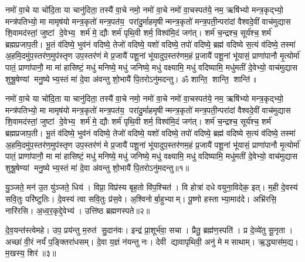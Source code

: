 \setcounter{anuvakam}{0}
नमो॑ वा॒चे या चो॑दि॒ता या चानु॑दिता॒ तस्यै॑ वा॒चे नमो॒ नमो॑ वा॒चे नमो॑ वा॒चस्पत॑ये॒ नम॒ ऋषि॑भ्यो मन्त्र॒कृद्भ्यो॒ मन्त्र॑पतिभ्यो॒ मा मामृष॑यो मन्त्र॒कृतो॑ मन्त्र॒पत॑य॒ परा॑दु॒र्माहमृषीन्मन्त्र॒कृतो॑ मन्त्र॒पती॒न्परा॑दां वैश्वदे॒वीं वाच॑मुद्यास शि॒वामद॑स्तां॒ जुष्टां दे॒वेभ्य॒ शर्म॑ मे॒ द्यौः  शर्म॑ पृथि॒वी शर्म॒ विश्व॑मि॒दं जग॑त्। 
शर्म॑ च॒न्द्रश्च॒ सूर्य॑श्च॒ शर्म॑ ब्रह्मप्रजाप॒ती। 
भू॒तं व॑दिष्ये॒ भुव॑नं वदिष्ये॒ तेजो॑ वदिष्ये॒ यशो॑ वदिष्ये॒ तपो॑ वदिष्ये॒ ब्रह्म॑ वदिष्ये स॒त्यं व॑दिष्ये॒ तस्मा॑ अ॒हमि॒दमु॑प॒स्तर॑ण॒मुप॑स्तृण उप॒स्तर॑णं मे प्र॒जायै॑ पशू॒नां भू॑यादुप॒स्तर॑णम॒हं प्र॒जायै॑ पशू॒नां भू॑यासं॒ प्राणा॑पानौ मृ॒त्योर्मा॑ पातं॒ प्राणा॑पानौ॒ मा मा॑ हासिष्टं॒ मधु॑ मनिष्ये॒ मधु॑ जनिष्ये॒ मधु॑ वक्ष्यामि॒ मधु॑ वदिष्यामि॒ मधु॑मतीं दे॒वेभ्यो॒ वाच॑मुद्यास शुश्रू॒षेण्यां मनु॒ष्येभ्य॒स्तं मा॑ दे॒वा अ॑वन्तु शो॒भायै॑ पि॒तरोऽनु॑मदन्तु। 
ॐ शान्ति॒ शान्ति॒ शान्ति॑॥ 

नमो॑ वा॒चे या चो॑दि॒ता या चानु॑दिता॒ तस्यै॑ वा॒चे नमो॒ नमो॑ वा॒चे नमो॑ वा॒चस्पत॑ये॒ नम॒ ऋषि॑भ्यो मन्त्र॒कृद्भ्यो॒ मन्त्र॑पतिभ्यो॒ मा मामृष॑यो मन्त्र॒कृतो॑ मन्त्र॒पत॑य॒ परा॑दु॒र्माहमृषीन्मन्त्र॒कृतो॑ मन्त्र॒पती॒न्परा॑दां वैश्वदे॒वीं वाच॑मुद्यास शि॒वामद॑स्तां॒ जुष्टां दे॒वेभ्य॒ शर्म॑ मे॒ द्यौः  शर्म॑ पृथि॒वी शर्म॒ विश्व॑मि॒दं जग॑त्। 
शर्म॑ च॒न्द्रश्च॒ सूर्य॑श्च॒ शर्म॑ ब्रह्मप्रजाप॒ती। 
भू॒तं व॑दिष्ये॒ भुव॑नं वदिष्ये॒ तेजो॑ वदिष्ये॒ यशो॑ वदिष्ये॒ तपो॑ वदिष्ये॒ ब्रह्म॑ वदिष्ये स॒त्यं व॑दिष्ये॒ तस्मा॑ अ॒हमि॒दमु॑प॒स्तर॑ण॒मुप॑स्तृण उप॒स्तर॑णं मे प्र॒जायै॑ पशू॒नां भू॑यादुप॒स्तर॑णम॒हं प्र॒जायै॑ पशू॒नां भू॑यासं॒ प्राणा॑पानौ मृ॒त्योर्मा॑ पातं॒ प्राणा॑पानौ॒ मा मा॑ हासिष्टं॒ मधु॑ मनिष्ये॒ मधु॑ जनिष्ये॒ मधु॑ वक्ष्यामि॒ मधु॑ वदिष्यामि॒ मधु॑मतीं दे॒वेभ्यो॒ वाच॑मुद्यास शुश्रू॒षेण्यां मनु॒ष्येभ्य॒स्तं मा॑ दे॒वा अ॑वन्तु शो॒भायै॑ पि॒तरोऽनु॑मदन्तु॥१॥\anuvakamend

यु॒ञ्जते॒ मन॑ उ॒त यु॑ञ्जते॒ धिय॑। 
विप्रा॒ विप्र॑स्य बृह॒तो वि॑प॒श्चित॑। 
वि होत्रा॑ दधे वयुना॒विदेक॒ इत्। 
म॒ही दे॒वस्य॑ सवि॒तुः परि॑ष्टुतिः। 
दे॒वस्य॑ त्वा सवि॒तुः प्र॑स॒वे। 
अ॒श्विनोर्बा॒हुभ्याम्। 
पू॒ष्णो हस्ताभ्या॒माद॑दे। 
अभ्रि॑रसि॒ नारि॑रसि। 
अ॒ध्व॒र॒कृद्दे॒वेभ्य॑। 
उत्ति॑ष्ठ ब्रह्मणस्पते॥२॥

दे॒व॒यन्त॑स्त्वेमहे। 
उप॒ प्रय॑न्तु म॒रुत॑ सु॒दान॑वः। 
इन्द्र॑ प्रा॒शूर्भ॑वा॒ सचा। 
प्रैतु॒ ब्रह्म॑ण॒स्पति॑। 
प्र दे॒व्ये॑तु सू॒नृता। 
अच्छा॑ वी॒रं नर्यं॑ प॒ङ्क्तिरा॑धसम्। 
दे॒वा य॒ज्ञं न॑यन्तु नः। 
देवी द्यावापृथिवी॒ अनु॑ मे मसाथाम्। 
ऋ॒द्ध्यास॑म॒द्य। 
म॒खस्य॒ शिर॑॥३॥

